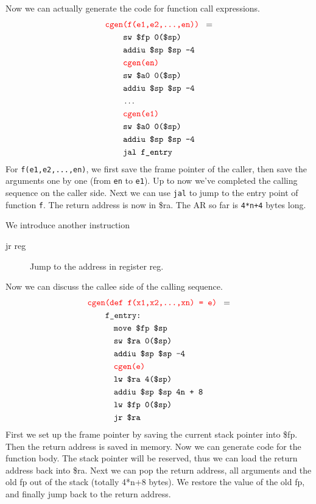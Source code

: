 Now we can actually generate the code for function call expressions. 
\begin{align*}
\texttt{\color{red}cgen}&\texttt{\color{red}(f(e1,e2,...,en)) }=\\
&\texttt{sw \$fp 0(\$sp)}\\
&\texttt{addiu \$sp \$sp -4}\\
&\texttt{\color{red}cgen(en)}\\
&\texttt{sw \$a0 0(\$sp)}\\
&\texttt{addiu \$sp \$sp -4}\\
&\dots\\
&\texttt{\color{red}cgen(e1)}\\
&\texttt{sw \$a0 0(\$sp)}\\
&\texttt{addiu \$sp \$sp -4}\\
&\texttt{jal f\_entry}
\end{align*}
For \texttt{f(e1,e2,...,en)}, we first save the frame pointer of the caller, then save the arguments one by one (from \texttt{en} to \texttt{e1}). Up to now we've completed the calling sequence on the caller side. Next we can use \texttt{jal} to jump to the entry point of function \texttt{f}. The return address is now in \$ra. The AR so far is \texttt{4*n+4} bytes long.  

We introduce another instruction
\begin{description}
\item[jr reg]Jump to the address in register reg.
\end{description}
Now we can discuss the callee side of the calling sequence. 
\begin{align*}
\texttt{\color{red}cgen}&\texttt{\color{red}(def f(x1,x2,...,xn) = e) }=\\
&\texttt{f\_entry:}\\
&\quad\texttt{move \$fp \$sp}\\
&\quad\texttt{sw \$ra 0(\$sp)}\\
&\quad\texttt{addiu \$sp \$sp -4}\\
&\quad\texttt{\color{red}cgen(e)}\\
&\quad\texttt{lw \$ra 4(\$sp)}\\
&\quad\texttt{addiu \$sp \$sp 4n + 8}\\
&\quad\texttt{lw \$fp 0(\$sp)}\\
&\quad\texttt{jr \$ra}\\
\end{align*}
First we set up the frame pointer by saving the current stack pointer into \$fp. Then the return address is saved in memory. Now we can generate code for the function body. The stack pointer will be reserved, thus we can load the return address back into \$ra. Next we can pop the return address, all arguments and the old fp out of the stack (totally 4*n+8 bytes). We restore the value of the old fp, and finally jump back to the return address. 


